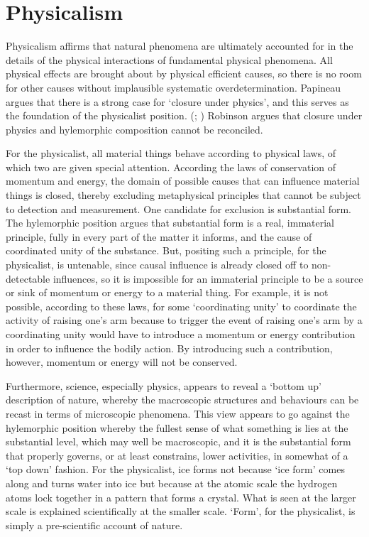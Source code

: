 \section{Physicalism}

Physicalism affirms that natural phenomena are ultimately accounted for in the details of the physical interactions of fundamental physical phenomena.  All physical effects are brought about by physical efficient causes, so there is no room for other causes without implausible systematic overdetermination. Papineau argues that there is a strong case for `closure under physics', and this serves as the foundation of the physicalist position. (\cite[][]{Papineau2001-PAPTRO}; \cite[][]{papineau2002thinking}) Robinson argues that closure under physics and hylemorphic composition cannot be reconciled. \parencite[][]{Robinson2014-ROBMHA-3}

For the physicalist, all material things behave according to physical laws, of which two are given special attention.
According the laws of conservation of momentum and energy, the domain of possible causes that can influence material things is closed, thereby excluding metaphysical principles that cannot be subject to detection and measurement.
One candidate for exclusion is substantial form. The hylemorphic position argues that substantial form is a real, immaterial principle, fully in every part of the matter it informs, and the cause of coordinated unity of the substance. But, positing such a principle, for the physicalist, is untenable, since causal influence is already closed off to non-detectable influences, so it is impossible for an immaterial principle to be a source or sink of momentum or energy to a material thing. For example, it is not possible, according to these laws, for some `coordinating unity' to coordinate the activity of raising one's arm because to trigger the event of raising one's arm by a coordinating unity would have to introduce a momentum or energy contribution in order to influence the bodily action. By introducing such a contribution, however, momentum or energy will not be conserved.

Furthermore, science, especially physics, appears to reveal a `bottom up' description of nature, whereby the macroscopic structures and behaviours can be recast in terms of microscopic phenomena. This view appears to go against the hylemorphic position whereby the fullest sense of what something is lies at the substantial level, which may well be macroscopic, and it is the substantial form that properly governs, or at least constrains, lower activities, in somewhat of a `top down' fashion. For the physicalist, ice forms not because `ice form' comes along and turns water into ice but because at the atomic scale the hydrogen atoms lock together in a pattern that forms a crystal. What is seen at the larger scale is explained scientifically at the smaller scale. `Form', for the physicalist, is simply a pre-scientific account of nature.

